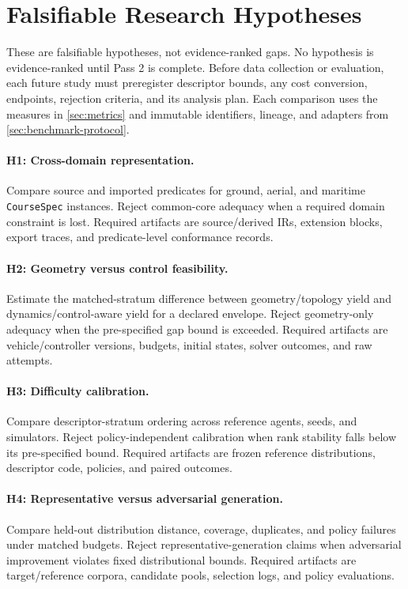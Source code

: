 \section{Falsifiable Research Hypotheses}
\label{sec:open-problems}

These are falsifiable hypotheses, not evidence-ranked gaps. No hypothesis is
evidence-ranked until Pass 2 is complete. Before data collection or evaluation, each
future study must preregister descriptor bounds, any cost conversion, endpoints,
rejection criteria, and its analysis plan. Each comparison uses the measures in
\cref{sec:metrics} and immutable identifiers, lineage, and adapters from
\cref{sec:benchmark-protocol}.

\paragraph{H1: Cross-domain representation.}
Compare source and imported predicates for ground, aerial, and maritime
\texttt{CourseSpec} instances. Reject common-core adequacy when a required
domain constraint is lost. Required artifacts are source/derived IRs, extension blocks,
export traces, and predicate-level conformance records.

\paragraph{H2: Geometry versus control feasibility.}
Estimate the matched-stratum difference between geometry/topology yield and
dynamics/control-aware yield for a declared envelope. Reject geometry-only adequacy
when the pre-specified gap bound is exceeded. Required artifacts are vehicle/controller
versions, budgets, initial states, solver outcomes, and raw attempts.

\paragraph{H3: Difficulty calibration.}
Compare descriptor-stratum ordering across reference agents, seeds, and simulators.
Reject policy-independent calibration when rank stability falls below its pre-specified
bound. Required artifacts are frozen reference distributions, descriptor code, policies,
and paired outcomes.

\paragraph{H4: Representative versus adversarial generation.}
Compare held-out distribution distance, coverage, duplicates, and policy failures under
matched budgets. Reject representative-generation claims when adversarial improvement
violates fixed distributional bounds. Required artifacts are target/reference corpora,
candidate pools, selection logs, and policy evaluations.

